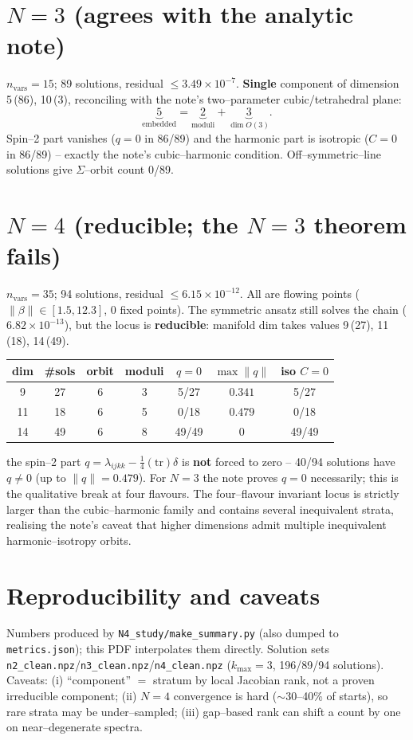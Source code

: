 \documentclass[11pt]{article}
\begin{document}
\section{$N=3$ (agrees with the analytic note)}
$n_{\mathrm{vars}}=15$; 89 solutions, residual $\le3.49\times10^{-7}$. {\bfseries Single} component of dimension 5\,(86), 10\,(3), reconciling with the note's two--parameter cubic/tetrahedral plane:
\[ \underbrace{5}_{\text{embedded}}=\underbrace{2}_{\text{moduli}}+\underbrace{3}_{\dim O(3)}. \]
Spin--2 part vanishes ($q=0$ in 86/89) and the harmonic part is isotropic ($C=0$ in 86/89) -- exactly the note's cubic--harmonic condition. Off--symmetric--line solutions give $\Sigma$--orbit count 0/89.
\section{$N=4$ (reducible; the $N=3$ theorem fails)}
$n_{\mathrm{vars}}=35$; 94 solutions, residual $\le6.15\times10^{-12}$. All are flowing points ($\|\beta\|\in[1.5,12.3]$, 0 fixed points). The symmetric ansatz still solves the chain ($6.82\times10^{-13}$), but the locus is {\bfseries reducible}: manifold dim takes values 9\,(27), 11\,(18), 14\,(49).
\begin{center}\begin{tabular}{ccccccc}\toprule
dim & \#sols & orbit & moduli & $q{=}0$ & $\max\|q\|$ & iso $C{=}0$\\ \midrule
9 & 27 & 6 & 3 & 5/27 & $0.341$ & 5/27 \\
11 & 18 & 6 & 5 & 0/18 & $0.479$ & 0/18 \\
14 & 49 & 6 & 8 & 49/49 & $0$ & 49/49 \\
\bottomrule\end{tabular}\end{center}
 the spin--2 part $q=\lambda_{ijkk}-\tfrac14(\mathrm{tr})\delta$ is {\bfseries not} forced to zero -- 40/94 solutions have $q\neq0$ (up to $\|q\|=0.479$). For $N=3$ the note proves $q=0$ necessarily; this is the qualitative break at four flavours. The four--flavour invariant locus is strictly larger than the cubic--harmonic family and contains several inequivalent strata, realising the note's caveat that higher dimensions admit multiple inequivalent harmonic--isotropy orbits.
\section{Reproducibility and caveats}
Numbers produced by \texttt{N4\_study/make\_summary.py} (also dumped to \texttt{metrics.json}); this PDF interpolates them directly. Solution sets \texttt{n2\_clean.npz}/\texttt{n3\_clean.npz}/\texttt{n4\_clean.npz} ($k_{\max}=3$, 196/89/94 solutions). Caveats: (i) ``component'' $=$ stratum by local Jacobian rank, not a proven irreducible component; (ii) $N=4$ convergence is hard ($\sim$30--40\% of starts), so rare strata may be under--sampled; (iii) gap--based rank can shift a count by one on near--degenerate spectra.
\end{document}
